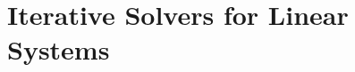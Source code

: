 \documentclass[../main.tex]{subfiles}
\begin{document}
\part{Iterative Solvers for Linear Systems}\label{part:solvers}





\end{document}
